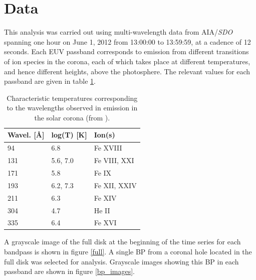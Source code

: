 \documentclass[preprint2]{aastex}
\begin{document}
\section{Data}\label{data}
This analysis was carried out using multi-wavelength data from AIA/\textit{SDO}
spanning one hour on June 1, 2012 from 13:00:00 to 13:59:59, at a cadence of 12
seconds.
Each EUV passband corresponds to emission
from different transitions of ion species in the corona, each of which takes
place at different temperatures, and hence different heights, above the
photosphere.
The relevant values for each passband are given in table \ref{temps}.
\begin{table}[h]
\centering
    \begin{tabular}{l l l}
        \hline\hline
        Wavel. [\AA{}] & log(T) [K] & Ion(s) \\
        \hline
        94 & 6.8 & Fe {\small XVIII} \\
        131 & 5.6, 7.0 & Fe {\small VIII, XXI} \\
        171 & 5.8 & Fe {\small IX} \\
        193 & 6.2, 7.3 & Fe {\small XII, XXIV} \\
        211 & 6.3 & Fe {\small XIV} \\
        304 & 4.7 & He {\small II} \\
        335 & 6.4 & Fe {\small XVI} \\
    \end{tabular}
\caption{Characteristic temperatures corresponding to the wavelengths observed
    in emission in the solar corona (from \cite{Lemen}).}
\label{temps}
\end{table}

A grayscale image of the full disk at the beginning of the time series for each
bandpass is shown in figure \ref{full}.
A single BP from a coronal hole located in the full disk was selected for analysis.
Grayscale images showing this BP in each passband are shown in figure \ref{bp_images}.
\end{document}
